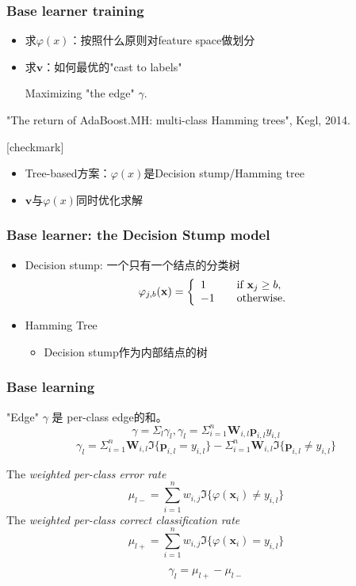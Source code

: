 \documentclass{beamer}
\begin{document}
\begin{frame}
\frametitle{Base learner training}
\begin{itemize}
\item 求$\varphi(x)$：按照什么原则对feature space做划分
\item 求$\mathbf{v}$：如何最优的"cast to labels"

\pause

\begin{block}{}
Maximizing "the edge" $\gamma$.
\end{block}

\pause

\end{itemize}
      {\color{purple} "The return of AdaBoost.MH: multi-class Hamming trees", Kegl, 2014.}
{
  [checkmark]
  \begin{itemize}
    \item Tree-based方案：$\varphi(x)$是Decision stump/Hamming tree
    \item $\mathbf{v}$与$\varphi(x)$同时优化求解
  \end{itemize}
}
\end{frame}

\begin{frame}
\frametitle{Base learner: the Decision Stump model}
\begin{itemize}
\item Decision stump: 一个只有一个结点的分类树
$$ \varphi_{j,b}(\mathbf{x}) = \left\{
  \begin{array}{l l}
    1 & \quad \text{if } \mathbf{x}_j \geq b, \\
    -1 & \quad \text{otherwise.}
  \end{array} \right.$$
\item Hamming Tree
\begin{itemize}
  \item Decision stump作为内部结点的树
\end{itemize}
\end{itemize}
\end{frame}


\begin{frame}
\frametitle{Base learning}

"Edge" $\gamma$ 是 per-class edge的和。
$$\gamma = \Sigma_l \gamma_l, \gamma_l = \Sigma_{i=1}^n \mathbf{W}_{i,l} \mathbf{p}_{i,l} y_{i,l} $$
$$ \gamma_l = \Sigma_{i=1}^{n}\mathbf{W}_{i,l}\mathfrak{I}\{\mathbf{p}_{i,l} = y_{i,l}\} - \Sigma_{i=1}^{n}\mathbf{W}_{i,l}\mathfrak{I}\{\mathbf{p}_{i,l} \neq y_{i,l}\} $$

\pause

The \textit{weighted per-class error rate}
$$\mu_{l-} = \sum_{i=1}^{n}w_{i,j}\mathfrak{I}\{\varphi(\mathbf{x}_i) \neq y_{i,l}\}$$
The \textit{weighted per-class correct classification rate}
$$\mu_{l+} = \sum_{i=1}^{n}w_{i,j}\mathfrak{I}\{\varphi(\mathbf{x}_i) = y_{i,l}\}$$

\pause

$$\gamma_l = \mu_{l+} - \mu_{l-}$$

\end{frame}
\end{document}
